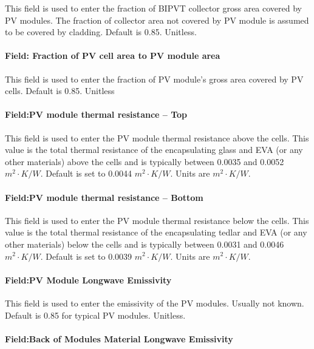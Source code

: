 This field is used to enter the fraction of BIPVT collector gross area covered by PV modules. The fraction of collector area not covered by PV module is assumed to be covered by cladding. Default is 0.85. Unitless.

\paragraph{Field: Fraction of PV cell area to PV module area}\label{BIPVT-field-fraction-PVcell}

This field is used to enter the fraction of PV module’s gross area covered by PV cells. Default is 0.85. Unitless

\paragraph{Field:PV module thermal resistance – Top}\label{BIPVT-field-PVmodule-resistance-top}

This field is used to enter the PV module thermal resistance above the cells. This value is the total thermal resistance of the encapsulating glass and EVA (or any other materials) above the cells and is typically between 0.0035 and 0.0052 \(m^2\cdot K/W\). Default is set to 0.0044 \(m^2\cdot K/W\). Units are \(m^2\cdot K/W\).


\paragraph{Field:PV module thermal resistance – Bottom}\label{BIPVT-field-PVmodule-resistance-bottom}

This field is used to enter the PV module thermal resistance below the cells. This value is the total thermal resistance of the encapsulating tedlar and EVA (or any other materials) below the cells and is typically between 0.0031 and 0.0046 \(m^2\cdot K/W\). Default is set to 0.0039 \(m^2\cdot K/W\). Units are \(m^2\cdot K/W\).

\paragraph{Field:PV Module Longwave Emissivity}\label{BIPVT-field-PVmodule-emissivity}

This field is used to enter the emissivity of the PV modules. Usually not known. Default is 0.85 for typical PV modules. Unitless.

\paragraph{Field:Back of Modules Material Longwave Emissivity}\label{BIPVT-field-moduleBack-emissivity}

